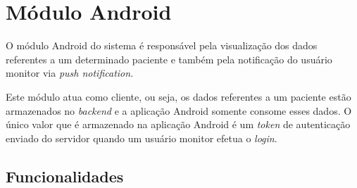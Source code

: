 \section{Módulo Android}

O módulo Android do sistema é responsável pela visualização dos dados referentes a um
determinado paciente e também pela notificação do usuário monitor via 
\textit{push notification}.

Este módulo atua como cliente, ou seja, os dados referentes a um paciente estão armazenados
no \textit{backend} e a aplicação Android somente consome esses dados. O único valor que é
armazenado na aplicação Android é um \textit{token} de autenticação enviado do servidor quando
um usuário monitor efetua o \textit{login}.

\subsection{Funcionalidades}


